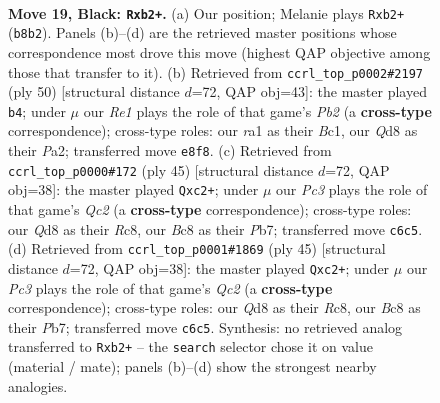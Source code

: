 \documentclass[11pt]{article}
\begin{document}
\clearpage

\begin{figure}[p]\centering
\begin{subfigure}{0.46\textwidth}\centering
\resizebox{\linewidth}{!}{%
\newchessgame
\chessboard[
  setfen={1rbqr1k1/p2ppp2/2p4B/5P1Q/P1PbB3/2N3P1/1P5K/R4R2 b - - 2 19},
  showmover=false,
  pgfstyle=straightmove, color=movearrow, markmove={b8-b2}
]}
\caption{}
\end{subfigure}\hfill
\begin{subfigure}{0.46\textwidth}\centering
\resizebox{\linewidth}{!}{%
\newchessgame
\chessboard[
  setfen={r1b2rk1/pp4pp/4p3/4Pn2/4Bpq1/2QR4/PP3PP1/R1B3K1 w - - 4 26},
  showmover=false,
  pgfstyle=straightmove, color=movearrow, markmove={b2-b4}
]}
\caption{}
\end{subfigure}
\\[4pt]
\begin{subfigure}{0.46\textwidth}\centering
\resizebox{\linewidth}{!}{%
\newchessgame
\chessboard[
  setfen={2r1r1k1/1pq2p2/p2b2p1/3p1NP1/7P/1P2BQ2/1PP5/1K1R2R1 b - - 0 23},
  showmover=false,
  pgfstyle=straightmove, color=movearrow, markmove={c7-c2}
]}
\caption{}
\end{subfigure}\hfill
\begin{subfigure}{0.46\textwidth}\centering
\resizebox{\linewidth}{!}{%
\newchessgame
\chessboard[
  setfen={2r1r1k1/1pq2p2/p2b2p1/3p1NP1/7P/1P2BQ2/1PP5/1K1R2R1 b - - 0 23},
  showmover=false,
  pgfstyle=straightmove, color=movearrow, markmove={c7-c2}
]}
\caption{}
\end{subfigure}
\caption{\textbf{Move 19, Black: \texttt{Rxb2+}.} (a) Our position; Melanie plays \texttt{Rxb2+} (\texttt{b8b2}). Panels (b)--(d) are the retrieved master positions whose correspondence most drove this move (highest QAP objective among those that transfer to it). (b) Retrieved from \texttt{ccrl\_top\_p0002\#2197} (ply 50) [structural distance $d$=72, QAP obj=43]: the master played \texttt{b4}; under $\mu$ our \emph{Re1} plays the role of that game's \emph{Pb2} (a \textbf{cross-type} correspondence); cross-type roles: our \emph{r}a1 as their \emph{B}c1, our \emph{Q}d8 as their \emph{P}a2; transferred move \texttt{e8f8}. (c) Retrieved from \texttt{ccrl\_top\_p0000\#172} (ply 45) [structural distance $d$=72, QAP obj=38]: the master played \texttt{Qxc2+}; under $\mu$ our \emph{Pc3} plays the role of that game's \emph{Qc2} (a \textbf{cross-type} correspondence); cross-type roles: our \emph{Q}d8 as their \emph{R}c8, our \emph{B}c8 as their \emph{P}b7; transferred move \texttt{c6c5}. (d) Retrieved from \texttt{ccrl\_top\_p0001\#1869} (ply 45) [structural distance $d$=72, QAP obj=38]: the master played \texttt{Qxc2+}; under $\mu$ our \emph{Pc3} plays the role of that game's \emph{Qc2} (a \textbf{cross-type} correspondence); cross-type roles: our \emph{Q}d8 as their \emph{R}c8, our \emph{B}c8 as their \emph{P}b7; transferred move \texttt{c6c5}. Synthesis: no retrieved analog transferred to \texttt{Rxb2+} -- the \texttt{search} selector chose it on value (material / mate); panels (b)--(d) show the strongest nearby analogies.}
\label{fig:thought-m37}
\end{figure}
\end{document}
